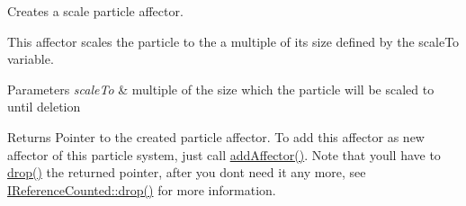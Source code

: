 Creates a scale particle affector. 

This affector scales the particle to the a multiple of its size defined by the scale\+To variable. 
\begin{DoxyParams}{Parameters}
{\em scale\+To} & multiple of the size which the particle will be scaled to until deletion \\
\hline
\end{DoxyParams}
\begin{DoxyReturn}{Returns}
Pointer to the created particle affector. To add this affector as new affector of this particle system, just call \hyperlink{classirr_1_1scene_1_1IParticleSystemSceneNode_a401f5afbbb748878011c5ceb7d447f8b}{add\+Affector()}. Note that you\textquotesingle{}ll have to \hyperlink{classirr_1_1IReferenceCounted_a03856a09355b89d178090c4a5f738543}{drop()} the returned pointer, after you don\textquotesingle{}t need it any more, see \hyperlink{classirr_1_1IReferenceCounted_a03856a09355b89d178090c4a5f738543}{I\+Reference\+Counted\+::drop()} for more information. 
\end{DoxyReturn}
\mbox{\label{classirr_1_1scene_1_1IParticleSystemSceneNode_abb4fe6b6346ede961805166fc5355fef}} 
